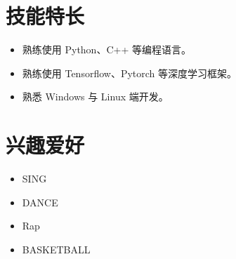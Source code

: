 \documentclass[11pt]{article}
\newlength{\iconwidth}
\begin{document}
\begin{minipage}[t]{0.6\textwidth}
        \section[技能特长]{\makebox[\iconwidth][c]{\color{SYSU_Green}{\faWrench}}\quad 技能特长}
        \begin{itemize}
        \setlength{\itemsep}{0.5em}
            \item 熟练使用 Python、C++ 等编程语言。
            \item 熟练使用 Tensorflow、Pytorch 等深度学习框架。
            \item 熟悉 Windows 与 Linux 端开发。
        \end{itemize}
    \end{minipage}
    \hfill
    \begin{minipage}[t]{0.35\textwidth}
        \section[兴趣爱好]{\makebox[\iconwidth][c]{\color{SYSU_Green}{\faStar}}\quad 兴趣爱好}
        \begin{itemize}
        \setlength{\itemsep}{0.5em}
            \item SING
            \item DANCE
            \item Rap
            \item BASKETBALL
        \end{itemize}
    \end{minipage}
    
\end{document}
